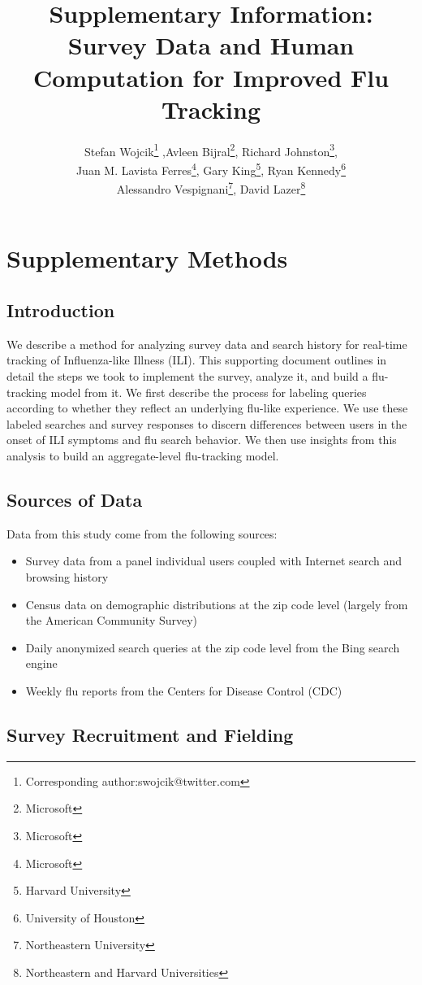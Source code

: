 \documentclass[12pt]{article}
\title{Supplementary Information: \\ Survey Data and Human Computation for Improved Flu Tracking}
\author{Stefan Wojcik\footnote{Corresponding author:swojcik@twitter.com}
,Avleen Bijral\footnote{Microsoft}, 
Richard Johnston\footnote{Microsoft},\\
Juan M. Lavista Ferres\footnote{Microsoft}, 
Gary King\footnote{Harvard University}, 
Ryan Kennedy\footnote{University of Houston}\\ 
Alessandro Vespignani\footnote{Northeastern University},
David Lazer\footnote{Northeastern and Harvard Universities}}
\begin{document}
\maketitle

\clearpage

\tableofcontents

\clearpage

\singlespacing

\newpage

\section{Supplementary Methods} 

\subsection{Introduction}

We describe a method for analyzing survey data and search history for real-time tracking of Influenza-like Illness (ILI). This supporting document outlines in detail the steps we took to implement the survey, analyze it, and build a flu-tracking model from it. We first describe the process for labeling queries according to whether they reflect an underlying flu-like experience. We use these labeled searches and survey responses to discern differences between users in the onset of ILI symptoms and flu search behavior. We then use insights from this analysis to build an aggregate-level flu-tracking model. 

\subsection{Sources of Data}
Data from this study come from the following sources:
\begin{itemize}
\item Survey data from a panel individual users coupled with Internet search and browsing history
\item Census data on demographic distributions at the zip code level (largely from the American Community Survey)
\item Daily anonymized search queries at the zip code level from the Bing search engine
\item Weekly flu reports from the Centers for Disease Control (CDC)
\end{itemize}

\subsection{Survey Recruitment and Fielding}
\end{document}
